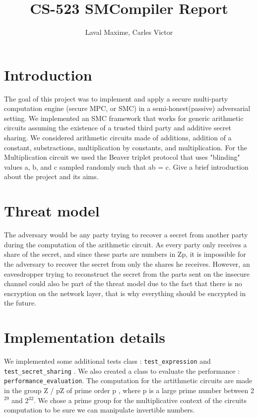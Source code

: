 \documentclass[10pt,conference,compsocconf]{IEEEtran}
\title{CS-523 SMCompiler Report}
\author{Laval Maxime, Carles Victor}
\date{}
\begin{document}
\maketitle

\section{Introduction}
The goal of this project was to implement and apply a secure multi-party computation engine (secure MPC, or SMC) in a semi-honest(passive) adversarial setting. We implemented an SMC framework that works for generic arithmetic circuits assuming the existence of a trusted third party and additive secret sharing. We considered arithmetic circuits made of additions, addition of a constant, substractions, multiplication by constants, and multiplication. For the Multiplication circuit we used the Beaver triplet protocol that uses "blinding" values a, b, and c sampled randomly such that ab = c.
Give a brief introduction about the project and its aims.

\section{Threat model}
The adversary would be any party trying to recover a secret from another party during the computation of the arithmetic circuit. As every party only receives a share of the secret, and since these parts are numbers in Zp, it is impossible for the adversary to recover the secret from only the shares he receives.
However, an eavesdropper trying to reconstruct the secret from the parts sent on the insecure channel could also be part of the threat model due to the fact that there is no encryption on the network layer, that is why everything should be encrypted in the future.
 

\section{Implementation details}
We implemented some additional tests class : \texttt{test\_expression} and \texttt{test\_secret\_sharing} . We also created a class to evaluate the performance : \texttt{performance\_evaluation}. The computation for the artithmetic circuits are made in the group Z / pZ of prime order p , where p is a large prime number between 2$^{29}$ and 2$^{32}$. We chose a prime group for the multiplicative context of the circuits computation to be sure we can manipulate invertible numbers.
\end{document}
